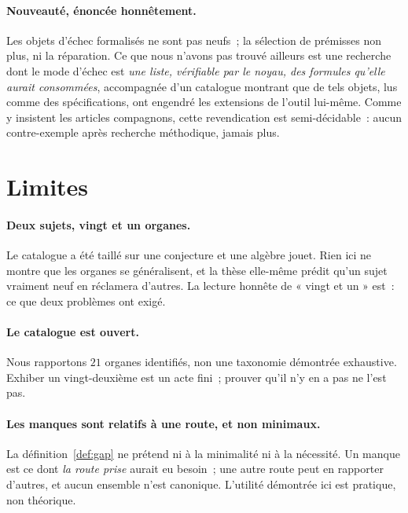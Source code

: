 \documentclass[11pt]{article}
\theoremstyle{remark}\newtheorem{remarque}{Remarque}
\begin{document}
\paragraph{Nouveauté, énoncée honnêtement.} Les objets d'échec formalisés ne sont pas
neufs~; la sélection de prémisses non plus, ni la réparation. Ce que nous n'avons pas
trouvé ailleurs est une recherche dont le mode d'échec est \emph{une liste, vérifiable
par le noyau, des formules qu'elle aurait consommées}, accompagnée d'un catalogue
montrant que de tels objets, lus comme des spécifications, ont engendré les extensions de
l'outil lui-même. Comme y insistent les articles compagnons, cette revendication est
semi-décidable~: aucun contre-exemple après recherche méthodique, jamais plus.

\section{Limites}
\label{sec:limitations}

\paragraph{Deux sujets, vingt et un organes.} Le catalogue a été taillé sur une
conjecture et une algèbre jouet. Rien ici ne montre que les organes se généralisent, et
la thèse elle-même prédit qu'un sujet vraiment neuf en réclamera d'autres. La lecture
honnête de « vingt et un » est~: ce que deux problèmes ont exigé.

\paragraph{Le catalogue est ouvert.} Nous rapportons $21$ organes identifiés, non une
taxonomie démontrée exhaustive. Exhiber un vingt-deuxième est un acte fini~; prouver
qu'il n'y en a pas ne l'est pas.

\paragraph{Les manques sont relatifs à une route, et non minimaux.} La
définition~\ref{def:gap} ne prétend ni à la minimalité ni à la nécessité. Un manque est
ce dont \emph{la route prise} aurait eu besoin~; une autre route peut en rapporter
d'autres, et aucun ensemble n'est canonique. L'utilité démontrée ici est pratique, non
théorique.
\end{document}
